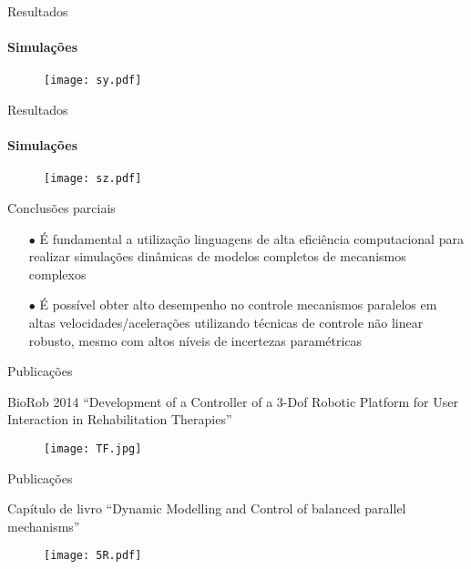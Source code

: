 \documentclass[25pt,landscape]{beamer}
\begin{document}
\begin{frame}{Resultados}
	\framesubtitle{Simula\c{c}\~oes}
	\begin{figure}[!h]
        \centering
        \texttt{[image: sy.pdf]}
    \end{figure}
\end{frame}

\begin{frame}{Resultados}
	\framesubtitle{Simula\c{c}\~oes}
	\begin{figure}[!h]
        \centering
        \texttt{[image: sz.pdf]}
    \end{figure}
\end{frame}

\begin{frame}{Conclus\~oes parciais}
	\begin{block}{}
		\begin{itemize}
			\pause
			\item[$\bullet$] \'E fundamental a utiliza\c{c}\~ao linguagens de alta efici\^encia computacional para realizar  simula\c{c}\~oes din\^amicas de modelos completos de mecanismos complexos
			\pause
			\item[$\bullet$] \'E poss\'ivel obter alto desempenho no controle mecanismos paralelos em altas velocidades/acelera\c{c}\~oes utilizando t\'ecnicas de controle n\~ao linear robusto, mesmo com altos n\'iveis de incertezas param\'etricas
		\end{itemize}
	\end{block}
\end{frame}

\begin{frame}{Publica\c{c}\~oes}
    \begin{block}{BioRob 2014}
        ``Development of a Controller of a 3-Dof Robotic Platform for User Interaction in Rehabilitation Therapies''
    \end{block}
    \begin{figure}[!h]
        \centering
        \texttt{[image: TF.jpg]}
    \end{figure}
\end{frame}

\begin{frame}{Publica\c{c}\~oes}
    \begin{block}{Cap\'itulo de livro}
        ``Dynamic Modelling and Control of balanced parallel mechanisms''
    \end{block}
    \begin{figure}[!h]
        \centering
        \texttt{[image: 5R.pdf]}
    \end{figure}
\end{frame}
\end{document}
